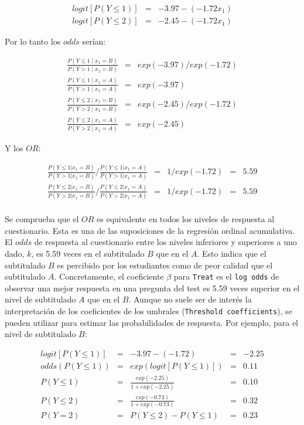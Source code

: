 \documentclass[
  12pt,
  a4paper,
  extrafontsizes,
  onecolumn,
  openright]{memoir}
\begin{document}
\[
\begin{aligned}
logit [P(Y \le 1)] & = & -3.97 - (-1.72 x_1) \\
logit [P(Y \le 2)] & = & -2.45 - (-1.72 x_1)
\end{aligned}
\]

Por lo tanto los \(odds\) serían:

\[
\begin{aligned}
\frac{P(Y \le 1 \mid x_1 = B)}{P(Y > 1 \mid x_1 = B)} & = & exp(-3.97)/exp(-1.72) \\
\frac{P(Y \le 1 \mid x_1 = A)}{P(Y > 1 \mid x_1 = A)} & = & exp(-3.97) \\
\frac{P(Y \le 2 \mid x_1 = B)}{P(Y > 2 \mid x_1 = B)} & = & exp(-2.45)/exp(-1.72) \\
\frac{P(Y \le 2 \mid x_1 = A)}{P(Y > 2 \mid x_1 = A)} & = & exp(-2.45)
\end{aligned}
\]

Y los \(OR\):

\[
\begin{aligned}
\frac{P(Y \le 1 | x_1=B)}{P(Y > 1 | x_1=B)} / \frac{P(Y \le 1 | x_1=A)}{P(Y > 1 | x_1=A)} & = & 1/exp(-1.72) & = & 5.59 \\
\frac{P(Y \le 2 | x_1=B)}{P(Y > 2 | x_1=B)} / \frac{P(Y \le 2 | x_1=A)}{P(Y > 2 | x_1=A)} & = & 1/exp(-1.72) & = & 5.59 \\
\end{aligned}
\]

Se comprueba que el \(OR\) es equivalente en todos los niveles de
respuesta al cuestionario. Esta es una de las suposiciones de la
regresión ordinal acumulativa. El \(odds\) de respuesta al cuestionario
entre los niveles inferiores y superiores a uno dado, \(k\), es 5.59
veces en el subtitulado \(B\) que en el \(A\). Esto indica que el
subtitulado \(B\) es percibido por los estudiantes como de peor calidad
que el subtitulado \(A\). Concretamente, el coeficiente \(\beta\) para
\texttt{Treat} es el \texttt{log\ odds} de observar una mejor respuesta
en una pregunta del test es 5.59 veces superior en el nivel de
subtitulado \(A\) que en el \(B\). Aunque no suele ser de interés la
interpretación de los coeficientes de los umbrales
(\texttt{Threshold\ coefficients}), se pueden utilizar para estimar las
probabilidades de respuesta. Por ejemplo, para el nivel de subtitulado
\(B\):

\[
\begin{aligned}
logit [P(Y \le 1)] & = & -3.97 - (-1.72) & = & -2.25 \\
odds (P(Y \le 1)) & = & exp(logit [P(Y \le 1)]) & = & 0.11 \\
P(Y \le 1) & = & \frac{exp(-2.25)}{1 + exp(-2.25)} & = & 0.10 \\
P(Y \le 2) & = & \frac{exp(-0.73)}{1 + exp(-0.73)} & = & 0.32 \\
P(Y = 2) & = & P(Y \le 2) - P(Y \le 1) & = &  0.23 
\end{aligned}
\]
\end{document}
